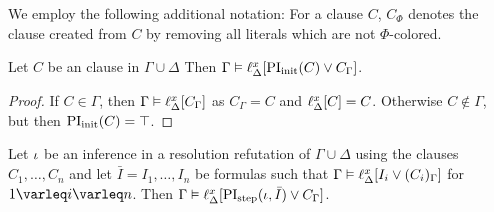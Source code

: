 We employ the following additional notation: For a clause $C$, $C_\Phi$ denotes the clause created from $C$ by removing all literals which are not $\Phi$-colored.

\begin{lemma}
	\label{lemma:gamma_entails_init}
	Let $C$ be an clause in $\Gamma \cup \Delta$ 
	Then $\Gamma \entails \lifdelta{\PIinit(C) \lor\nolinebreak C_\Gamma}$.
\end{lemma}
\begin{proof}
	If $C \in \Gamma$, then $\Gamma \vDash \ell_{\Delta}^{x}[C_\Gamma]$ as $C_\Gamma = C$ and $\ell_{\Delta}^{x}[C] = C$.
	Otherwise $C \not\in \Gamma$, but then $\PIinit(C) =\nolinebreak{} \top$.
\end{proof}


\begin{lemma}
	\label{lemma:gamma_entails_step}
	Let $\iota$ be an inference in a resolution refutation of $\Gamma \cup \Delta$ using the clauses $C_1, \dots, C_n$
	and let $\bar I = I_1, \dots, I_n$ be formulas such that 
	$\Gamma \entails \lifdelta{I_i \lor\nolinebreak (C_i)_\Gamma} $ for $1 \varleq i \varleq n$.
	Then
	$\Gamma \entails \lifdelta{\PIstep(\inference, \bar I) \lor\nolinebreak C_\Gamma} $.
\end{lemma}
